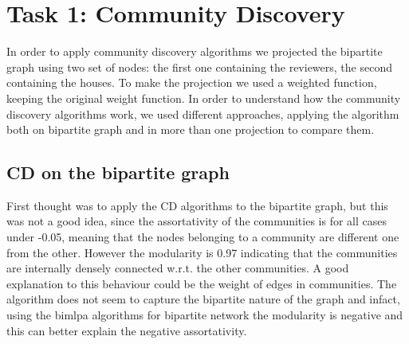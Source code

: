 \documentclass[sigchi]{acmart}
\begin{document}
\section{Task 1: Community Discovery} \label{sec4}
In order to apply community discovery algorithms we projected the bipartite graph using two set of nodes: the first one containing the reviewers, the second containing the houses. To make the projection we used a weighted function, keeping the original weight function. \newline
In order to understand how the community discovery algorithms work,
we used different approaches, applying the algorithm both on bipartite graph and in more than one projection to compare them.
\subsection{CD on the bipartite graph}
First thought was to apply the CD algorithms to the bipartite graph, but this was not a good idea, since the assortativity of the communities is for all cases under -0.05, meaning that the nodes belonging to a community are different one from the other. However the modularity is 0.97 indicating that the communities are internally densely connected w.r.t. the other communities. A good explanation to this behaviour could be the weight of edges in communities.  
The algorithm does not seem to capture the bipartite nature of the graph and infact, using the bimlpa algorithms for bipartite network the modularity is negative and this can better explain the negative assortativity. 
    
\end{document}
